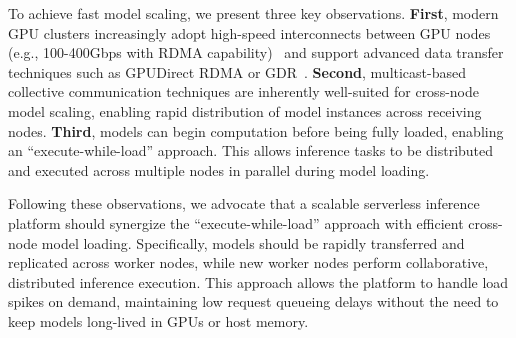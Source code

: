 To achieve fast model scaling, we present three key observations. 
\textbf{First}, modern GPU clusters increasingly adopt high-speed interconnects between GPU nodes (e.g., 100-400Gbps with RDMA capability)~\cite{acme_nsdi24, kundu_llm_analysis_arxiv24, azure_ai_cluster_url} and support advanced data transfer techniques such as GPUDirect RDMA or GDR~\cite{gdr}. 
\textbf{Second}, multicast-based collective communication techniques are inherently well-suited for cross-node model scaling, enabling rapid distribution of model instances across receiving nodes. 
\textbf{Third}, models can begin computation before being fully loaded, enabling an ``execute-while-load'' approach. This allows inference tasks to be distributed and executed across multiple nodes in parallel during model loading. 

Following these observations, we advocate that a scalable serverless inference platform should synergize the ``execute-while-load'' approach with efficient cross-node model loading. 
Specifically, models should be rapidly transferred and replicated across worker nodes, while new worker nodes perform collaborative, distributed inference execution. 
This approach allows the platform to handle load spikes on demand, maintaining low request queueing delays without the need to keep models long-lived in GPUs or host memory.  



